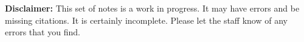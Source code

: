 \documentclass[
letterpaper, %
oneside
]{tufte-handout}
\author{6.1600 Course Staff:
Henry Corrigan-Gibbs,
Yael Kalai,
Ben Kettle (TA),
Nickolai Zeldovich}
\date{Fall 2022}
\begin{document}


{\color{red}
\begin{framed}
\noindent
\textbf{Disclaimer:}
This set of notes is a work in progress. It may have errors and be missing citations. It is certainly incomplete. Please let the staff know of any errors that you find.
\end{framed}
}
\end{document}
